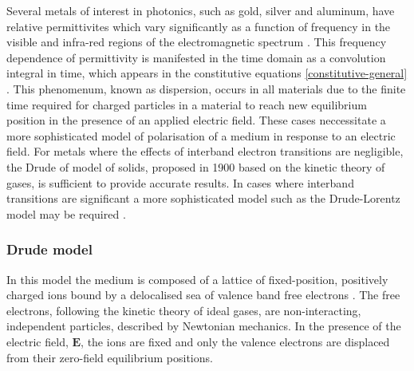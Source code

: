 Several metals of interest in photonics, such as gold, silver and aluminum, have relative permittivites which vary significantly as a function of frequency in the visible and infra-red regions of the electromagnetic spectrum \cite{Ordal:1983bg}.
This frequency dependence of permittivity is manifested in the time domain as a convolution integral in time, which appears in the constitutive equations \ref{constitutive-general} \cite{Jackson:490457}.
This phenomenum, known as dispersion, occurs in all materials due to the finite time required for charged particles in a material to reach new equilibrium position in the presence of an applied electric field.
These cases neccessitate a more sophisticated model of polarisation of a medium in response to an electric field. For metals where the effects of interband electron transitions are negligible, the Drude of model of solids, proposed in 1900 \cite{Drude:1900hg} based on the kinetic theory of gases, is sufficient to provide accurate results. In cases where interband transitions are significant a more sophisticated model such as the Drude-Lorentz model may be required \cite{Fox:2001wm,Taflove:1989ds}.

\subsubsection{Drude model}
\label{sub:The Drude Model}

In this model the medium is composed of a lattice of fixed-position, positively charged ions bound by a delocalised sea of valence band free electrons \cite{Ashcroft:2005wp,Bandyopadhyay:1503732}. The free electrons, following the kinetic theory of ideal gases, are non-interacting, independent particles, described by Newtonian mechanics. In the presence of the electric field, $\mathbf{E}$, the ions are fixed and only the valence electrons are displaced from their zero-field equilibrium positions.
%


